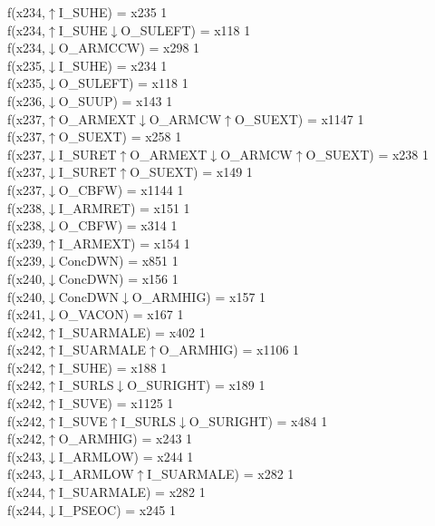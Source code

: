f(x234,$\uparrow$I\_SUHE) = x235 {1} \\
f(x234,$\uparrow$I\_SUHE$\downarrow$O\_SULEFT) = x118 {1} \\
f(x234,$\downarrow$O\_ARMCCW) = x298 {1} \\
f(x235,$\downarrow$I\_SUHE) = x234 {1} \\
f(x235,$\downarrow$O\_SULEFT) = x118 {1} \\
f(x236,$\downarrow$O\_SUUP) = x143 {1} \\
f(x237,$\uparrow$O\_ARMEXT$\downarrow$O\_ARMCW$\uparrow$O\_SUEXT) = x1147 {1} \\
f(x237,$\uparrow$O\_SUEXT) = x258 {1} \\
f(x237,$\downarrow$I\_SURET$\uparrow$O\_ARMEXT$\downarrow$O\_ARMCW$\uparrow$O\_SUEXT) = x238 {1} \\
f(x237,$\downarrow$I\_SURET$\uparrow$O\_SUEXT) = x149 {1} \\
f(x237,$\downarrow$O\_CBFW) = x1144 {1} \\
f(x238,$\downarrow$I\_ARMRET) = x151 {1} \\
f(x238,$\downarrow$O\_CBFW) = x314 {1} \\
f(x239,$\uparrow$I\_ARMEXT) = x154 {1} \\
f(x239,$\downarrow$ConcDWN) = x851 {1} \\
f(x240,$\downarrow$ConcDWN) = x156 {1} \\
f(x240,$\downarrow$ConcDWN$\downarrow$O\_ARMHIG) = x157 {1} \\
f(x241,$\downarrow$O\_VACON) = x167 {1} \\
f(x242,$\uparrow$I\_SUARMALE) = x402 {1} \\
f(x242,$\uparrow$I\_SUARMALE$\uparrow$O\_ARMHIG) = x1106 {1} \\
f(x242,$\uparrow$I\_SUHE) = x188 {1} \\
f(x242,$\uparrow$I\_SURLS$\downarrow$O\_SURIGHT) = x189 {1} \\
f(x242,$\uparrow$I\_SUVE) = x1125 {1} \\
f(x242,$\uparrow$I\_SUVE$\uparrow$I\_SURLS$\downarrow$O\_SURIGHT) = x484 {1} \\
f(x242,$\uparrow$O\_ARMHIG) = x243 {1} \\
f(x243,$\downarrow$I\_ARMLOW) = x244 {1} \\
f(x243,$\downarrow$I\_ARMLOW$\uparrow$I\_SUARMALE) = x282 {1} \\
f(x244,$\uparrow$I\_SUARMALE) = x282 {1} \\
f(x244,$\downarrow$I\_PSEOC) = x245 {1} \\
